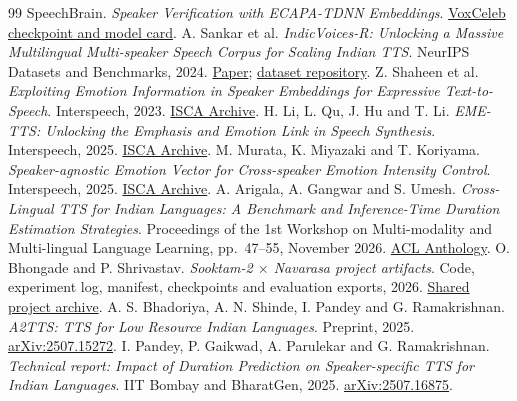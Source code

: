 \documentclass[11pt,a4paper]{article}
\begin{document}
\begin{thebibliography}{99}
 SpeechBrain. \emph{Speaker Verification with ECAPA-TDNN Embeddings}. \href{https://huggingface.co/speechbrain/spkrec-ecapa-voxceleb}{VoxCeleb checkpoint and model card}.
 A. Sankar et al. \emph{IndicVoices-R: Unlocking a Massive Multilingual Multi-speaker Speech Corpus for Scaling Indian TTS}. NeurIPS Datasets and Benchmarks, 2024. \href{https://arxiv.org/abs/2409.05356}{Paper}; \href{https://huggingface.co/datasets/ai4bharat/indicvoices_r}{dataset repository}.
 Z. Shaheen et al. \emph{Exploiting Emotion Information in Speaker Embeddings for Expressive Text-to-Speech}. Interspeech, 2023. \href{https://www.isca-archive.org/interspeech_2023/shaheen23_interspeech.html}{ISCA Archive}.
 H. Li, L. Qu, J. Hu and T. Li. \emph{EME-TTS: Unlocking the Emphasis and Emotion Link in Speech Synthesis}. Interspeech, 2025. \href{https://www.isca-archive.org/interspeech_2025/li25i_interspeech.html}{ISCA Archive}.
 M. Murata, K. Miyazaki and T. Koriyama. \emph{Speaker-agnostic Emotion Vector for Cross-speaker Emotion Intensity Control}. Interspeech, 2025. \href{https://www.isca-archive.org/interspeech_2025/murata25_interspeech.html}{ISCA Archive}.
 A. Arigala, A. Gangwar and S. Umesh. \emph{Cross-Lingual TTS for Indian Languages: A Benchmark and Inference-Time Duration Estimation Strategies}. Proceedings of the 1st Workshop on Multi-modality and Multi-lingual Language Learning, pp.\ 47--55, November 2026. \href{https://aclanthology.org/2026.multilll-1.6/}{ACL Anthology}.
 O. Bhongade and P. Shrivastav. \emph{Sooktam-2 \(\times\) Navarasa project artifacts}. Code, experiment log, manifest, checkpoints and evaluation exports, 2026. \href{https://drive.google.com/drive/folders/17_4z5fc2pWU12Bijkr2GYSiKVnu7UfBw}{Shared project archive}.
 A. S. Bhadoriya, A. N. Shinde, I. Pandey and G. Ramakrishnan. \emph{A2TTS: TTS for Low Resource Indian Languages}. Preprint, 2025. \href{https://arxiv.org/abs/2507.15272}{arXiv:2507.15272}.
 I. Pandey, P. Gaikwad, A. Parulekar and G. Ramakrishnan. \emph{Technical report: Impact of Duration Prediction on Speaker-specific TTS for Indian Languages}. IIT Bombay and BharatGen, 2025. \href{https://arxiv.org/abs/2507.16875}{arXiv:2507.16875}.
\end{thebibliography}
\end{document}
